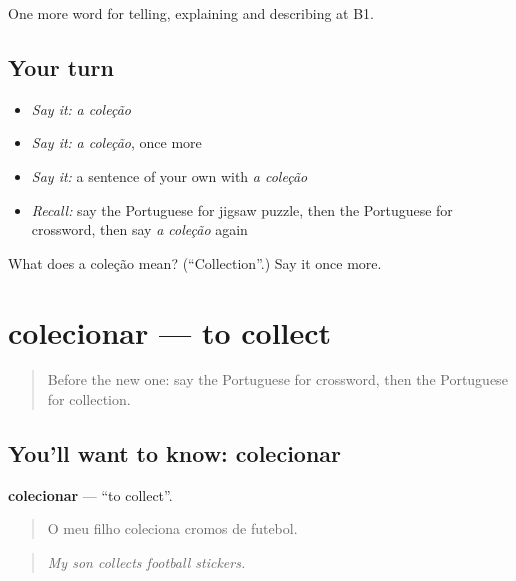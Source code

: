 \begin{grammarlens}[title={What you've built}]
One more word for telling, explaining and describing at B1.
\end{grammarlens}

\subsection*{Your turn}
\begin{itemize}
\raggedright
  \item \emph{Say it:} \emph{a coleção}
  \item \emph{Say it:} \emph{a coleção}, once more
  \item \emph{Say it:} a sentence of your own with \emph{a coleção}
  \item \emph{Recall:} say the Portuguese for jigsaw puzzle, then the Portuguese for crossword, then say \emph{a coleção} again
\end{itemize}

\begin{tcolorbox}[breakable,colback=teal!4,colframe=teal!35!black,title={Before you move on}]
What does a coleção mean? (\textquotedblleft{}Collection\textquotedblright{}.) Say it once more.
\end{tcolorbox}
\section[colecionar]{colecionar — to collect}

\label{lesson:PT-C504-colecionar}



\begin{quote}
Before the new one: say the Portuguese for crossword, then the Portuguese for collection.
\end{quote}

\subsection*{You'll want to know: colecionar}
\textbf{colecionar} — \textquotedblleft{}to collect\textquotedblright{}.

\begin{quote}
O meu filho coleciona cromos de futebol.
\end{quote}

\begin{quote}
\emph{My son collects football stickers.}
\end{quote}

